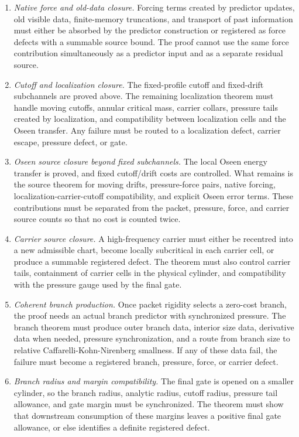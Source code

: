 \documentclass[11pt]{article}
\begin{document}
\begin{enumerate}[label=(\roman*)]
\item \emph{Native force and old-data closure.}  Forcing terms created by
predictor updates, old visible data, finite-memory truncations, and transport of
past information must either be absorbed by the predictor construction or
registered as force defects with a summable source bound.  The proof cannot use
the same force contribution simultaneously as a predictor input and as a
separate residual source.

\item \emph{Cutoff and localization closure.}  The fixed-profile cutoff and
fixed-drift subchannels are proved above.  The remaining localization theorem
must handle moving cutoffs, annular critical mass, carrier collars, pressure
tails created by localization, and compatibility between localization cells and
the Oseen transfer.  Any failure must be routed to a localization defect,
carrier escape, pressure defect, or gate.

\item \emph{Oseen source closure beyond fixed subchannels.}  The local Oseen
energy transfer is proved, and fixed cutoff/drift costs are controlled.  What
remains is the source theorem for moving drifts, pressure-force pairs, native
forcing, localization-carrier-cutoff compatibility, and explicit Oseen error
terms.  These contributions must be separated from the packet, pressure, force,
and carrier source counts so that no cost is counted twice.

\item \emph{Carrier source closure.}  A high-frequency carrier must either be
recentred into a new admissible chart, become locally subcritical in each carrier
cell, or produce a summable registered defect.  The theorem must also control
carrier tails, containment of carrier cells in the physical cylinder, and
compatibility with the pressure gauge used by the final gate.

\item \emph{Coherent branch production.}  Once packet rigidity selects a
zero-cost branch, the proof needs an actual branch predictor with synchronized
pressure.  The branch theorem must produce outer branch data, interior size
data, derivative data when needed, pressure synchronization, and a route from
branch size to relative Caffarelli-Kohn-Nirenberg smallness.  If any of these
data fail, the failure must become a registered branch, pressure, force, or
carrier defect.

\item \emph{Branch radius and margin compatibility.}  The final gate is opened
on a smaller cylinder, so the branch radius, analytic radius, cutoff radius,
pressure tail allowance, and gate margin must be synchronized.  The theorem must
show that downstream consumption of these margins leaves a positive final gate
allowance, or else identifies a definite registered defect.


\end{enumerate}
\end{document}
